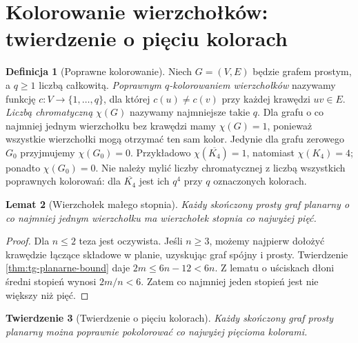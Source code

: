 \documentclass[11pt,a4paper]{report}
\numberwithin{equation}{section}
\theoremstyle{plain}
\newtheorem{twierdzenie}{Twierdzenie}[section]
\newtheorem{lemat}[twierdzenie]{Lemat}
\theoremstyle{definition}
\newtheorem{definicja}[twierdzenie]{Definicja}
\theoremstyle{remark}
\begin{document}
\section{Kolorowanie wierzchołków: twierdzenie o pięciu kolorach}
\label{sec:tg-five-color}

\begin{definicja}[Poprawne kolorowanie]
Niech $G=(V,E)$ będzie grafem prostym, a $q\ge1$ liczbą całkowitą.
\emph{Poprawnym $q$-kolorowaniem wierzchołków} nazywamy
funkcję $c:V\to\{1,\ldots,q\}$, dla której
$c(u)\ne c(v)$ przy każdej krawędzi $uv\in E$.
\emph{Liczbą chromatyczną} $\chi(G)$ nazywamy najmniejsze
takie $q$. Dla grafu o co najmniej jednym wierzchołku
bez krawędzi mamy $\chi(G)=1$, ponieważ wszystkie
wierzchołki mogą otrzymać ten sam kolor.
Jedynie dla grafu zerowego $G_0$ przyjmujemy $\chi(G_0)=0$.
Przykładowo $\chi(\overline{K_4})=1$, natomiast
$\chi(K_4)=4$; ponadto $\chi(G_0)=0$.
Nie należy mylić liczby chromatycznej z liczbą wszystkich
poprawnych kolorowań: dla $\overline{K_4}$ jest ich $q^4$
przy $q$ oznaczonych kolorach.
\end{definicja}

\begin{lemat}[Wierzchołek małego stopnia]
Każdy skończony prosty graf planarny o co najmniej jednym
wierzchołku ma wierzchołek stopnia co najwyżej pięć.
\end{lemat}

\begin{proof}
Dla $n\le2$ teza jest oczywista. Jeśli $n\ge3$, możemy
najpierw dołożyć krawędzie łączące składowe w planie,
uzyskując graf spójny i prosty. Twierdzenie
\ref{thm:tg-planarne-bound} daje $2m\le6n-12<6n$.
Z lematu o uściskach dłoni średni stopień wynosi $2m/n<6$.
Zatem co najmniej jeden stopień jest nie większy niż pięć.
\end{proof}

\begin{twierdzenie}[Twierdzenie o pięciu kolorach]
\label{thm:tg-5color}
Każdy skończony graf prosty planarny można poprawnie
pokolorować co najwyżej pięcioma kolorami.
\end{twierdzenie}
\end{document}
